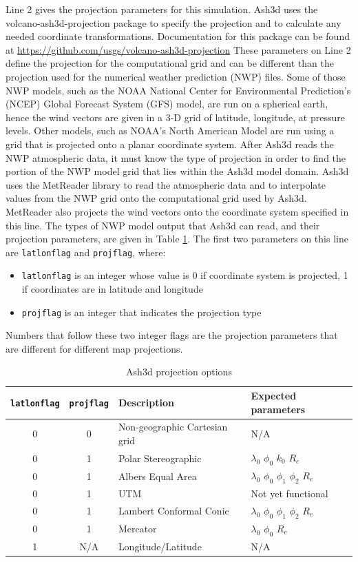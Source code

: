 Line 2 gives the projection parameters for this simulation.
Ash3d uses the volcano-ash3d-projection package to specify the
projection and to calculate any needed coordinate transformations.
Documentation for this package can be found at
\url{https://github.com/usgs/volcano-ash3d-projection}
These parameters on Line 2 define the projection for the computational
grid and can be different than the projection used for the numerical
weather prediction (NWP) files. Some of
those NWP models, such as the NOAA National Center for Environmental
Prediction’s (NCEP) Global Forecast System (GFS) model, are run
on a spherical earth, hence the wind vectors are given in a 3-D
grid of latitude, longitude, at pressure levels. Other models, such
as NOAA’s North American Model are run using a grid that is
projected onto a planar coordinate system. After Ash3d reads
the NWP atmospheric data, it must know the type of projection in order
to find the portion of the NWP model grid that lies within the
Ash3d model domain.
Ash3d uses the MetReader library to read the atmospheric data and to
interpolate values from the NWP grid onto the computational grid used
by Ash3d.  MetReader also projects the wind vectors onto the coordinate
system specified in this line.  
The types of NWP model output that
Ash3d can read, and their projection parameters, are given in
Table \ref{tab:ProjOpt}.
The first two parameters on this line are \texttt{latlonflag} and
\texttt{projflag},
where:
\begin{itemize}
 \item \texttt{latlonflag} is an integer whose value is 0 if coordinate system is
projected, 1 if coordinates are in latitude and longitude
 \item \texttt{projflag} is an integer that indicates the projection type
\end{itemize}
Numbers that follow these two integer flags are the projection parameters
that are different for different map projections.
\small
\begin{table}[htbp]
\begin{center}
\begin{tabular}{| c | c | l | l |}
\hline
\texttt{latlonflag} & \texttt{projflag} & Description & Expected parameters\\
\hline
0 & 0 & Non-geographic Cartesian grid & N/A \\
0 & 1 & Polar Stereographic & $\lambda_0$ $\phi_0$ $k_0$ $R_e$ \\
0 & 1 & Albers Equal Area & $\lambda_0$ $\phi_0$ $\phi_1$ $\phi_2$ $R_e$ \\
0 & 1 & UTM & Not yet functional \\
0 & 1 & Lambert Conformal Conic & $\lambda_0$ $\phi_0$ $\phi_1$ $\phi_2$ $R_e$\\
0 & 1 & Mercator & $\lambda_0$ $\phi_0$ $R_e$\\
1 & N/A & Longitude/Latitude & N/A \\
\hline
\end{tabular}
\caption{\label{tab:ProjOpt}Ash3d projection options}
\end{center}
\end{table}
